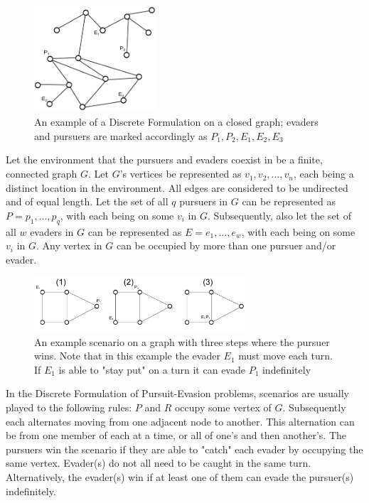 \documentclass{article}
\begin{document}
\begin{figure}[htb]
\centering
\includegraphics[width=0.4\textwidth]{"graph1"}
\caption{An example of a Discrete Formulation on a closed graph; evaders and pursuers are marked accordingly as \(P_1,P_2,E_1,E_2,E_3\)}
\end{figure}

Let the environment that the pursuers and evaders coexist in be a finite, connected graph \(G\). Let \(G\)'s vertices be represented as \(v_1,v_2,...,v_n\), each being a distinct location in the environment. All edges are considered to be undirected and of equal length. Let the set of all \(q\) pursuers in \(G\) can be represented as \(P = {p_1,...,p_q}\), with each being on some \(v_i\) in \(G\). Subsequently, also let the set of all \(w\) evaders in \(G\) can be represented as \(E = {e_1,...,e_w}\), with each being on some \(v_i\) in \(G\). Any vertex in \(G\) can be occupied by more than one pursuer and/or evader.

\begin{figure}[htb]
\centering
\includegraphics[width=0.7\textwidth]{"graph2_steps"}
\caption{An example scenario on a graph with three steps where the pursuer wins. Note that in this example the evader \(E_1\) must move each turn. If \(E_1\) is able to "stay put" on a turn it can evade \(P_1\) indefinitely}
\end{figure}

In the Discrete Formulation of Pursuit-Evasion problems, scenarios are usually played to the following rules: \(P\) and \(R\) occupy some vertex of \(G\). Subsequently each alternates moving from one adjacent node to another. This alternation can be from one member of each at a time, or all of one's and then another's. The pursuers win the scenario if they are able to "catch" each evader by occupying the same vertex. Evader(s) do not all need to be caught in the same turn. Alternatively, the evader(s) win if at least one of them can evade the pursuer(s) indefinitely.\cite{copsRobbers}
\end{document}
